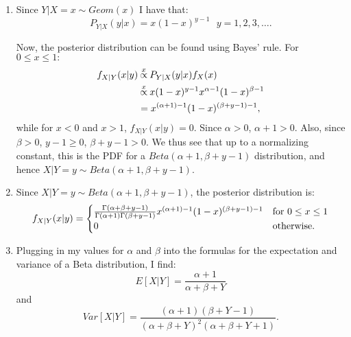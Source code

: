 \begin{problem}{19} $ $
\begin{enumerate}


\item Since $Y|X=x \sim Geom(x)$ I have that:
\begin{equation*}
P_{Y|X}(y|x) = x(1-x)^{y-1}~~~y=1, 2, 3, \ldots.
\end{equation*}

Now, the posterior distribution can be found using Bayes' rule.  For $ 0 \le x \le 1:$
\begin{align*}
f_{X|Y}(x|y) & \propof{x} P_{Y|X}(y|x)f_X(x) \\
& \propof{x} x (1-x)^{y-1}x^{\alpha -1}(1-x)^{\beta-1} \\
& = x^{(\alpha+1)-1}(1-x)^{(\beta+y-1)-1},
\end{align*}
while for $x <0 $ and $x>1 $, $f_{X|Y}(x|y) =0$. Since $\alpha>0$, $\alpha+1>0$.  Also, since $\beta >0$, $y-1 \ge 0$, $\beta+y-1>0$.  We thus see that up to a normalizing constant, this is the PDF for a $Beta(\alpha+1, \beta+y-1)$ distribution, and hence $X|Y=y \sim Beta(\alpha+1, \beta+y-1)$.

\item Since $X|Y=y \sim Beta(\alpha+1, \beta+y-1)$, the posterior distribution is:
\[
f_{X|Y}(x|y)=
  \begin{cases}
                                   \frac{\Gamma(\alpha+\beta+y-1)}{\Gamma(\alpha+1)\Gamma(\beta+y-1)} x^{(\alpha+1)-1}(1-x)^{(\beta+y-1)-1}& \text{for $ 0 \le x\le 1$} \\
                                   0 & \text{otherwise}.
  \end{cases}
\]

\item Plugging in my values for $\alpha$ and $\beta$ into the formulas for the expectation and variance of a Beta distribution, I find:
\begin{equation*}
E[X|Y] = \frac{\alpha+1}{\alpha+\beta +Y}
\end{equation*}
and
\begin{equation*}
Var[X|Y] = \frac{(\alpha+1)(\beta+Y-1)}{(\alpha+\beta +Y)^2(\alpha+\beta+Y+1)}.
\end{equation*}


\end{enumerate}
\end{problem}
 

